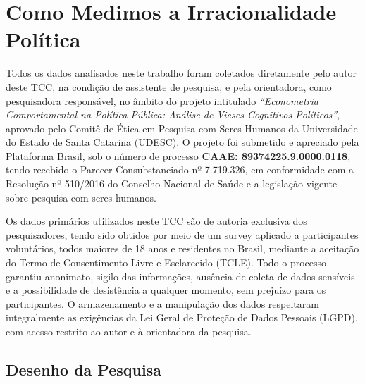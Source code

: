 \chapter{Como Medimos a Irracionalidade Política}
\label{capitulo_3}

Todos os dados analisados neste trabalho foram coletados diretamente pelo autor deste TCC, na condição de assistente de pesquisa, e pela orientadora, como pesquisadora responsável, no âmbito do projeto intitulado \textit{“Econometria Comportamental na Política Pública: Análise de Vieses Cognitivos Políticos”}, aprovado pelo Comitê de Ética em Pesquisa com Seres Humanos da Universidade do Estado de Santa Catarina (UDESC). O projeto foi submetido e apreciado pela Plataforma Brasil, sob o número de processo \textbf{CAAE: 89374225.9.0000.0118}, tendo recebido o Parecer Consubstanciado nº 7.719.326, em conformidade com a Resolução nº 510/2016 do Conselho Nacional de Saúde e a legislação vigente sobre pesquisa com seres humanos.

Os dados primários utilizados neste TCC são de autoria exclusiva dos pesquisadores, tendo sido obtidos por meio de um survey aplicado a participantes voluntários, todos maiores de 18 anos e residentes no Brasil, mediante a aceitação do Termo de Consentimento Livre e Esclarecido (TCLE). Todo o processo garantiu anonimato, sigilo das informações, ausência de coleta de dados sensíveis e a possibilidade de desistência a qualquer momento, sem prejuízo para os participantes. O armazenamento e a manipulação dos dados respeitaram integralmente as exigências da Lei Geral de Proteção de Dados Pessoais (LGPD), com acesso restrito ao autor e à orientadora da pesquisa.

\section{Desenho da Pesquisa}

